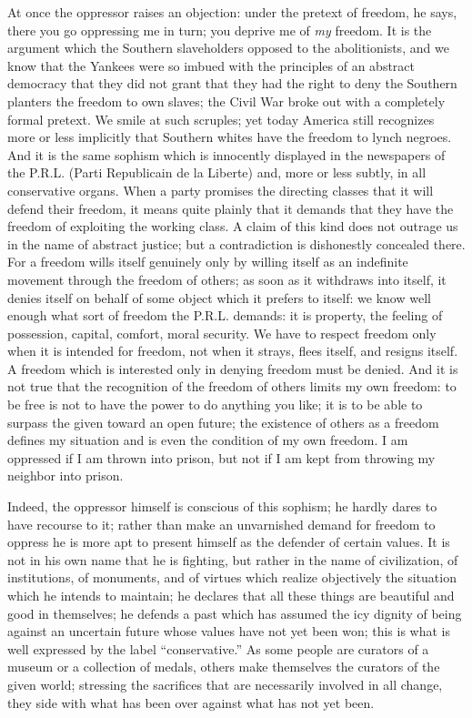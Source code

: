 \documentclass[11pt]{article}
\begin{document}
{{At once the oppressor raises an objection: under the pretext of freedom, he says, there you go oppressing me in turn; you deprive me of \textit{my} freedom. It is the argument which the Southern slaveholders opposed to the abolitionists, and we know that the Yankees were so imbued with the principles of an abstract democracy that they did not grant that they had the right to deny the Southern planters the freedom to own slaves; the Civil War broke out with a completely formal pretext. We smile at such scruples; yet today America still recognizes more or less implicitly that Southern whites have the freedom to lynch negroes. And it is the same sophism which is innocently displayed in the newspapers of the P.R.L. (Parti Republicain de la Liberte) and, more or less subtly, in all conservative organs. When a party promises the directing classes that it will defend their freedom, it means quite plainly that it demands that they have the freedom of exploiting the working class. A claim of this kind does not outrage us in the name of abstract justice; but a contradiction is dishonestly concealed there. For a freedom wills itself genuinely only by willing itself as an indefinite movement through the freedom of others; as soon as it withdraws into itself, it denies itself on behalf of some object which it prefers to itself: we know well enough what sort of freedom the P.R.L. demands: it is property, the feeling of possession, capital, comfort, moral security. We have to respect freedom only when it is intended for freedom, not when it strays, flees itself, and resigns itself. A freedom which is interested only in denying freedom must be denied. And it is not true that the recognition of the freedom of others limits my own freedom: to be free is not to have the power to do anything you like; it is to be able to surpass the given toward an open future; the existence of others as a freedom defines my situation and is even the condition of my own freedom. I am oppressed if I am thrown into prison, but not if I am kept from throwing my neighbor into prison.

Indeed, the oppressor himself is conscious of this sophism; he hardly dares to have recourse to it; rather than make an unvarnished demand for freedom to oppress he is more apt to present himself as the defender of certain values. It is not in his own name that he is fighting, but rather in the name of civilization, of institutions, of monuments, and of virtues which realize objectively the situation which he intends to maintain; he declares that all these things are beautiful and good in themselves; he defends a past which has assumed the icy dignity of being against an uncertain future whose values have not yet been won; this is what is well expressed by the label “conservative.” As some people are curators of a museum or a collection of medals, others make themselves the curators of the given world; stressing the sacrifices that are necessarily involved in all change, they side with what has been over against what has not yet been.

}}
\end{document}
